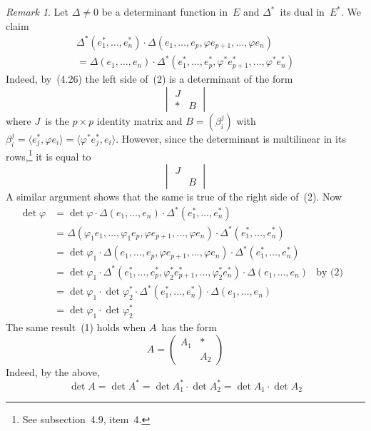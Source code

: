 \documentclass[letterpaper,12pt]{article}
\newcommand{\mult}{\cdot}
\newcommand{\sprod}[2]{\langle#1,#2\rangle}
\theoremstyle{definition}
\theoremstyle{remark}
\newtheorem*{rmk}{Remark}
\begin{document}
\begin{rmk}
Let \(\Delta\ne0\) be a determinant function in~\(E\) and \(\Delta^*\)~its dual in~\(E^*\). We claim
\begin{multline*}
\Delta^*(e_1^*,\ldots,e_n^*)\mult\Delta(e_1,\ldots,e_p,\varphi e_{p+1},\ldots,\varphi e_n)\\=\Delta(e_1,\ldots,e_n)\mult\Delta^*(e_1^*,\ldots,e_p^*,\varphi^* e_{p+1}^*,\ldots,\varphi^* e_n^*)\tag{2}
\end{multline*}
Indeed, by~(4.26) the left side of~(2) is a determinant of the form
\[\begin{vmatrix}
J&\\
*&B
\end{vmatrix}\]
where \(J\)~is the \(p\times p\) identity matrix and \(B=(\beta_i^j)\) with \(\beta_i^j=\sprod{e_j^*}{\varphi e_i}=\sprod{\varphi^* e_j^*}{e_i}\). However, since the determinant is multilinear in its rows,\footnote{See subsection~4.9, item~4.} it is equal to
\[\begin{vmatrix}
J&\\
&B
\end{vmatrix}\]
A similar argument shows that the same is true of the right side of~(2). Now
\begin{align*}
\det\varphi&=\det\varphi\mult\Delta(e_1,\ldots,e_n)\mult\Delta^*(e_1^*,\ldots,e_n^*)&&\\
	&=\Delta(\varphi_1e_1,\ldots,\varphi_1e_p,\varphi e_{p+1},\ldots,\varphi e_n)\mult\Delta^*(e_1^*,\ldots,e_n^*)&&\\
	&=\det\varphi_1\mult\Delta(e_1,\ldots,e_p,\varphi e_{p+1},\ldots,\varphi e_n)\mult\Delta^*(e_1^*,\ldots,e_n^*)&&\\
	&=\det\varphi_1\mult\Delta^*(e_1^*,\ldots,e_p^*,\varphi_2^* e_{p+1}^*,\ldots,\varphi_2^* e_n^*)\mult\Delta(e_1,\ldots,e_n)&\text{by~(2)}\\
	&=\det\varphi_1\mult\det\varphi_2^*\mult\Delta^*(e_1^*,\ldots,e_n^*)\mult\Delta(e_1,\ldots,e_n)\\
	&=\det\varphi_1\mult\det\varphi_2^*
\end{align*}
The same result~(1) holds when \(A\)~has the form
\[A=\begin{pmatrix}
A_1&*\\
&A_2
\end{pmatrix}\]
Indeed, by the above,
\[\det A=\det A^*=\det A_1^*\mult\det A_2^*=\det A_1\mult\det A_2\]
\end{rmk}
\end{document}
